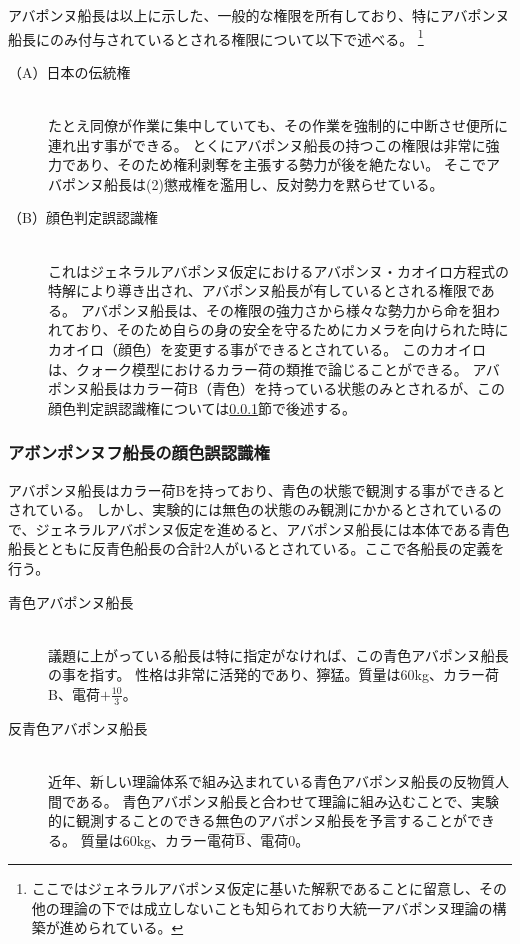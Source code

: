 \documentclass[12pt]{jsarticle}
\begin{document}
アバポンヌ船長は以上に示した、一般的な権限を所有しており、特にアバポンヌ船長にのみ付与されているとされる権限について以下で述べる。
\footnote{ここではジェネラルアバポンヌ仮定に基いた解釈であることに留意し、その他の理論の下では成立しないことも知られており大統一アバポンヌ理論の構築が進められている。}

\begin{description}
\item[（A）日本の伝統権]\mbox{}\\
たとえ同僚が作業に集中していても、その作業を強制的に中断させ便所に連れ出す事ができる。
とくにアバポンヌ船長の持つこの権限は非常に強力であり、そのため権利剥奪を主張する勢力が後を絶たない。
そこでアバポンヌ船長は(2)懲戒権を濫用し、反対勢力を黙らせている。

\item[（B）顔色判定誤認識権]\mbox{}\\
これはジェネラルアバポンヌ仮定におけるアバポンヌ・カオイロ方程式の特解により導き出され、アバポンヌ船長が有しているとされる権限である。
アバポンヌ船長は、その権限の強力さから様々な勢力から命を狙われており、そのため自らの身の安全を守るためにカメラを向けられた時にカオイロ（顔色）を変更する事ができるとされている。
このカオイロは、クォーク模型におけるカラー荷の類推で論じることができる。
アバポンヌ船長はカラー荷B（青色）を持っている状態のみとされるが、この顔色判定誤認識権については\ref{KAO}節で後述する。
\end{description}

\subsubsection{アボンポンヌフ船長の顔色誤認識権}\label{KAO}
アバポンヌ船長はカラー荷Bを持っており、青色の状態で観測する事ができるとされている。
しかし、実験的には無色の状態のみ観測にかかるとされているので、ジェネラルアバポンヌ仮定を進めると、アバポンヌ船長には本体である青色船長とともに反青色船長の合計2人がいるとされている。ここで各船長の定義を行う。

\begin{description}
\item[青色アバポンヌ船長]\mbox{}\\
議題に上がっている船長は特に指定がなければ、この青色アバポンヌ船長の事を指す。
性格は非常に活発的であり、獰猛。質量は60kg、カラー荷B、電荷$+\frac{10}{3}$。

\item[反青色アバポンヌ船長]\mbox{}\\
近年、新しい理論体系で組み込まれている青色アバポンヌ船長の反物質人間である。
青色アバポンヌ船長と合わせて理論に組み込むことで、実験的に観測することのできる無色のアバポンヌ船長を予言することができる。
質量は60kg、カラー電荷$\overline{\rm{B}}$、電荷0。
\end{description}
\end{document}

